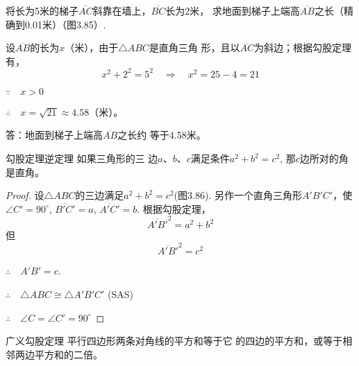 \begin{example}
    将长为5米的梯子$\overline{AC}$斜靠在墙上，$\overline{BC}$长为2米，
求地面到梯子上端高$\overline{AB}$之长（精确到0.01米）（图3.85）.
\end{example}



\begin{solution}
    设$\overline{AB}$的长为$x$（米），由于$\triangle ABC$是直角三角
形，且以$\overline{AC}$为斜边；根据勾股定理有，
\[x^2+2^2=5^2 \quad \Rightarrow\quad x^2=25-4=21\]

$\because\quad x>0$

$\therefore\quad x=\sqrt{21}\approx 4.58$（米）。

答：地面到梯子上端高$\overline{AB}$之长约
等于4.58米。
\end{solution}

\begin{blk}
    {勾股定理逆定理} 如果三角形的三
边$a$、$b$、$c$满足条件$a^2+b^2=c^2$, 那$c$边所对的角是直角。
\end{blk}


\begin{proof}
设$\triangle ABC$的三边满足$a^2+b^2=c^2$(图3.86). 
另作一个直角三角形$A'B'C'$，使$\angle C'=90^{\circ}$, $\overline{B'C'}=a$,
$\overline{A'C'}=b$. 根据勾股定理，
\[\overline{A' B'}^2=a^2+b^2\]
但
\[\overline{A'B'}^2=c^2\]

$\therefore\quad \overline{A'B'}=c$.

$\therefore\quad \triangle ABC\cong \triangle A'B'C'$ (SAS)

$\therefore\quad \angle C=\angle C'=90^{\circ}$
\end{proof}

\begin{figure}[htp]
    \centering
{}
    \caption{}
\end{figure}

\begin{blk}
    {广义勾股定理} 平行四边形两条对角线的平方和等于它
的四边的平方和，或等于相邻两边平方和的二倍。
\end{blk}

